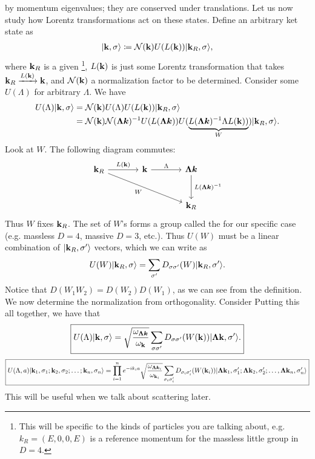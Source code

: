 \documentclass[11pt]{article}
\begin{document}
by momentum eigenvalues; they are conserved under translations. Let us
now study how Lorentz transformations act on these states. Define an 
arbitrary ket state as
\begin{align*}
    \lvert\mathbf{k}, \sigma\rangle \coloneqq \mathcal{N}(\mathbf{k}) U(L(\mathbf{k})) \lvert\mathbf{k}_R, \sigma\rangle,
\end{align*}
where $\mathbf{k}_R$ is a given \footnote{This will
be specific to the kinds of particles you are talking about, e.g.
$k_R = (E, 0, 0, E)$ is a reference momentum for the massless little
group in $D = 4$.}, $L(\mathbf{k})$ is just some Lorentz transformation 
that takes $\mathbf{k}_R \xrightarrow{L(\mathbf{k})} \mathbf{k}$, and $\mathcal{N}(\mathbf{k})$
a normalization factor to be determined. Consider some $U(\Lambda)$
for arbitrary $\Lambda$. We have
\begin{align*}
    U(\Lambda) \lvert\mathbf{k}, \sigma\rangle & = \mathcal{N}(\mathbf{k}) U(\Lambda) U(L(\mathbf{k})) \lvert\mathbf{k}_R, \sigma\rangle\\
    & = \mathcal{N}(\mathbf{k}) \mathcal{N}(\boldsymbol{\Lambda k})^{-1} U(L(\boldsymbol{\Lambda k})) U(\underbrace{L(\boldsymbol{\Lambda k})^{-1} \Lambda L(\mathbf{k}))}_{W}) \lvert\mathbf{k}_R, \sigma\rangle.
\end{align*}
Look at $W$. The following diagram commutes:
\[
    \begin{tikzcd}[column sep=large, row sep=large]
    \bfk_R \arrow[r, "\,L(\bfk)\,"] \arrow[rrd, "\,W\,"'] & \bfk \arrow[r, "\,\Lambda\,"] & \boldsymbol{\Lambda k} \arrow[d, "\,L(\boldsymbol{\Lambda k})^{-1}\,"] \\
    & & \bfk_R
    \end{tikzcd}
\]
Thus $W$ fixes $\mathbf{k}_R$. The set of $W$'s forms a group called the
 for our specific case (e.g. massless $D = 4$,
massive $D = 3$, etc.). Thus $U(W)$ must be a linear combination of
$\lvert\mathbf{k}_R, \sigma'\rangle$ vectors, which we can write as
\begin{align*}
    U(W) \lvert\mathbf{k}_R, \sigma\rangle = \sum_{\sigma'} D_{\sigma \sigma'}(W) \lvert\mathbf{k}_R, \sigma'\rangle.
\end{align*}
Notice that $D(W_1 W_2) = D(W_2) D(W_1)$, as we can see from the definition.
We now determine the normalization from orthogonality. Consider 
Putting this all together, we have that
\begin{align*}
    \boxed{U(\Lambda)\lvert\mathbf{k}, \sigma\rangle = \sqrt{\frac{\omega_{\boldsymbol{\Lambda k}}}{\omega_{\mathbf{k}}}}\sum_{\sigma \sigma'} D_{\sigma \sigma'}(W(\mathbf{k})) \lvert\boldsymbol{\Lambda \mathbf{k}}, \sigma'\rangle.}
\end{align*}
\begin{align*}
    \boxed{U(\Lambda, a)\lvert\mathbf{k}_1, \sigma_1; \mathbf{k}_2, \sigma_2; \ldots ; \mathbf{k}_n, \sigma_n\rangle
    = \prod_{i = 1}^n e^{-i k_i a}\sqrt{\frac{\omega_{\boldsymbol{\Lambda k}_i}}{\omega_{\mathbf{k}_i}}} \sum_{\sigma_i \sigma_i'} D_{\sigma_i \sigma_i'}(W(\mathbf{k}_i)) \lvert\boldsymbol{\Lambda \mathbf{k}}_1, \sigma_1'; \boldsymbol{\Lambda \mathbf{k}}_2, \sigma_2'; \ldots, \boldsymbol{\Lambda \mathbf{k}}_n, \sigma_n'\rangle}
\end{align*}
This will be useful when we talk about scattering later.
\end{document}
